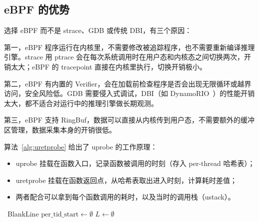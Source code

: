 \subsection{eBPF 的优势}

选择 eBPF 而不是 strace、GDB 或传统 DBI，有三个原因：

第一，eBPF 程序运行在内核里，不需要修改被追踪程序，也不需要重新编译推理引擎。strace 用 ptrace 会在每次系统调用时在用户态和内核态之间切换两次，开销太大；eBPF 的 tracepoint 直接在内核里执行，切换开销极小。

第二，eBPF 有内置的 Verifier，会在加载前检查程序是否会出现无限循环或越界访问，安全风险低。GDB 需要侵入式调试，DBI（如 DynamoRIO~\cite{bruening2003dynamorio}）的性能开销太大，都不适合对运行中的推理引擎做长期观测。

第三，eBPF 支持 RingBuf，数据可以直接从内核传到用户态，不需要额外的缓冲区管理，数据采集本身的开销很低。

算法~\ref{alg:uretprobe} 给出了 uprobe 的工作原理：

\begin{itemize}
    \item uprobe 挂载在函数入口，记录函数被调用的时刻（存入 per-thread 哈希表）；
    \item uretprobe 挂载在函数返回点，从哈希表取出进入时刻，计算耗时差值；
    \item 两者配合可以拿到每个函数调用的耗时，以及当时的调用栈（ustack）。
\end{itemize}

\begin{algorithm}[H]
\caption{uprobe/uretprobe 工作流程}
\label{alg:uretprobe}
\DontPrintSemicolon
{}

\ BlankLine
$\text{per\_tid\_start} \leftarrow \emptyset$ 
$L \leftarrow \emptyset$ 

\end{algorithm}

